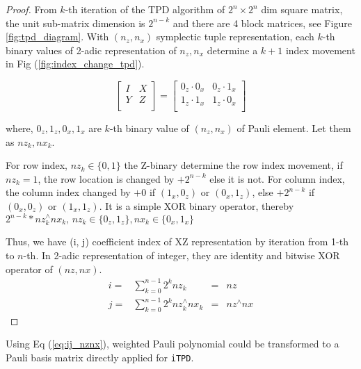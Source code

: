 \documentclass[twocolumn]{article}
\begin{document}
\begin{proof}
    From $k$-th iteration of the TPD algorithm of $2^n \times 2^n$ dim square matrix, 
    the unit sub-matrix dimension is $2^{n-k}$ and there are 4 block matrices, see Figure \ref{fig:tpd_diagram}.
    With $(n_z, n_x)$ symplectic tuple representation, 
    each $k$-th binary values of 2-adic representation of $n_z, n_x$ determine a $k+1$ index movement in Fig (\ref{fig:index_change_tpd}).

    \begin{equation}
        \begin{bmatrix}
            I& X\\
            Y & Z\\
        \end{bmatrix} = \begin{bmatrix}
            0_z \cdot 0_x & 0_z \cdot 1_x\\
            1_z \cdot 1_x & 1_z \cdot 0_x\\
        \end{bmatrix}
    \end{equation}
    
    where, $0_z, 1_z, 0_x, 1_x$ are $k$-th binary value of $(n_z, n_x)$ of Pauli element.
    Let them as $nz_k, nx_k$.

    For row index, $nz_k\in \{0, 1\}$ the Z-binary determine
    the row index movement, if $nz_k = 1$, the row location is changed by $+2^{n-k}$ else it is not.
    For column index, the column index changed by $+0$ if $(1_x, 0_z)$ or $(0_x, 1_z)$, 
    else $+2^{n-k}$ if $(0_x, 0_z)$ or $(1_x, 1_z)$.
    It is a simple XOR binary operator, thereby 
    $2^{n-k} * nz_k^{\wedge}nx_k, \, nz_k\in \{0_z, 1_z\}, nx_k \in \{0_x, 1_x\}$

    Thus, we have (i, j) coefficient index of XZ representation by iteration from 1-th to $n$-th. 
    In 2-adic representation of integer, they are identity and bitwise XOR operator of $(nz, nx)$.
    \begin{equation}
        \begin{array}{clcc}
        i =& \sum_{k=0}^{n-1} 2^{k} nz_k &=& nz\\
        j =& \sum_{k=0}^{n-1} 2^{k} nz_k^{\wedge} nx_k &=& nz^{\wedge}nx
        \end{array}
    \end{equation}

\end{proof}

Using Eq (\ref{eq:ij_nznx}), weighted Pauli polynomial could be transformed to 
a Pauli basis matrix directly applied for \texttt{iTPD}.
\end{document}
